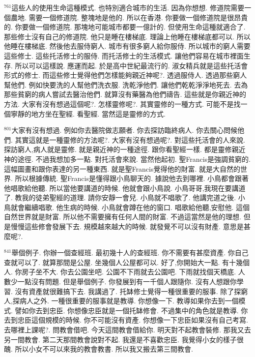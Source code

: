 \documentclass{book}
\begin{document}
$^{761}$這些人的使用生命這種模式.
也特別適合城市的生活.
因為你想想.
修道院需要一個農地.
需要一個修道院.
整塊地是他的.
所以在香港.
你要做一個修道院是很昂貴的.
你要做一個修道院.
那塊地可能城市都要一億計的.
但使用生命這種就適合了.
那些修士沒有自己的修道院.
他只是睡在樓梯底.
理論上他睡在樓梯底都可以.
所以他睡在樓梯底.
然後他去服侍窮人.
城市有很多窮人給你服侍.
所以城市的窮人需要這些修士.
這些托活修士的服侍.
而托活修士的生活模式.
讓他們容易在城市裡面生存.
所以可以這樣說.
應運而起.
於是高中世紀最流行的.
淑女精兵就是這些托活會形式的修士.
而這些修士覺得他們怎樣能夠親近神呢?.
透過服侍人.
透過那些窮人幫他們.
例如快要洗的人幫他們洗衣服.
洗乾淨他們.
讓他們乾乾淨淨地死去.
去為那些貧窮的病人嘗試去醫治他們.
就算沒有藥醫為他們禱告.
這些就是你親近神的方法.
大家有沒有想過這個呢?.
怎樣靈修呢?.
其實靈修的一種方式.
可能不是找一個寧靜的地方坐在聖經.
看聖經.
當然這是靈修的方式.

$^{801}$大家有沒有想過.
例如你去醫院做志願者.
你去探訪臨終病人.
你去關心問候他們.
其實這就是一種靈修的方法呢?.
大家有沒有想過呢?.
對這些托活會的人來說.
探訪窮人,病人就是靈修.
就是親近神的一種途徑.
跟你看聖經一樣.
都是靈修親近神的途徑.
不過我想加多一點.
對托活會來說.
當然他起初.
聖Francis是強調貧窮的.
這幅圖畫和跟你表達的另一種東西.
就是聖Francis覺得他的財富.
就是大自然的世界.
所以根據傳統.
聖Francis是懂得跟小鳥聊天的.
據說他去到哪裡.
小鳥都會跟著他唱歌給他聽.
所以當他要講道的時候.
他就會跟小鳥說.
小鳥哥哥,我現在要講道了.
教我的徒弟聖經的道理.
請你安靜一會兒.
小鳥就不唱歌了.
他講完道之後.
小鳥就會繼續唱歌.
他生病的時候.
小鳥就會蹲在他的窗口.
唱歌給他聽,安慰他.
這個自然世界就是財富.
所以他不需要擁有任何人間的財富.
不過這當然是他的理想.
但是慢慢這些修會發展下去.
規模越來越大的時候.
就發覺不可以沒有財產.
意思是甚麼呢?.

$^{841}$舉個例子.
你辦一個查經班.
最初幾十人的查經班.
你不需要有甚麼資產.
你自己查就可以了.
就算那間是公屋.
坐幾個人公屋都可以.
好了,你開始大一點.
有十幾個人.
你房子坐不大.
你去公園坐吧.
公園不下雨就去公園吧.
下雨就找個天橋底.
人數少一點沒有問題.
但是舉個例子.
你發展到有一千個人跟隨你.
沒有人想跟你學習.
沒有資產就很難搞下去.
我講過了.
托缽修士覺得一種很重要的服事.
除了探窮人,探病人之外.
一種很重要的服事就是教導.
你想像一下.
教導如果你去到一個模式.
譬如你去到忠臣.
你想像忠臣就是一個托缽修會.
不過集中的角色就是教導.
你去到忠臣這個規模的時候.
你不可能沒有資產.
你想像一下忠臣如果沒有自己考寫.
去哪裡上課呢?.
問教會借吧.
今天這間教會借給你.
明天對不起教會裝修.
那我又去另一間教會.
第二天那間教會說對不起.
我還是不喜歡忠臣.
我覺得小女的樣子很醜.
所以小女不可以來我的教會教書.
所以我又搬去第三間教會.
\end{document}
